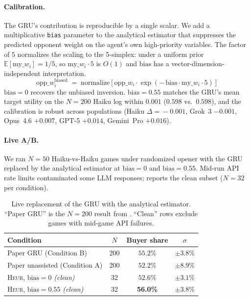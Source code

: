 \documentclass[11pt,a4paper]{article}
\begin{document}
\paragraph{Calibration.} The GRU's contribution is reproducible by a single scalar. We add a multiplicative \texttt{bias} parameter to the analytical estimator that suppresses the predicted opponent weight on the agent's own high-priority variables. The factor of $5$ normalizes the scaling to the 5-simplex: under a uniform prior $\mathbb{E}[\text{my\_}w_i] = 1/5$, so $\text{my\_}w_i \cdot 5$ is $O(1)$ and $\text{bias}$ has a vector-dimension-independent interpretation.
\begin{equation}
\text{opp\_}w_i^{\text{biased}} \;=\; \mathrm{normalize}\!\left[\text{opp\_}w_i \cdot \exp(-\,\text{bias} \cdot \text{my\_}w_i \cdot 5)\right]
\label{eq:bias_scalar}
\end{equation}
$\text{bias} = 0$ recovers the unbiased inversion. $\text{bias} = 0.55$ matches the GRU's mean target utility on the $N\!=\!200$ Haiku log within $0.001$ ($0.598$ vs.\ $0.598$), and the calibration is robust across populations (Haiku $\Delta\!=\!-0.001$, Grok~3 $-0.001$, Opus~4.6 $+0.007$, GPT-5 $+0.014$, Gemini~Pro $+0.016$).

\paragraph{Live A/B.} We ran $N\!=\!50$ Haiku-vs-Haiku games under randomized opener with the GRU replaced by the analytical estimator at $\text{bias} = 0$ and $\text{bias} = 0.55$. Mid-run API rate limits contaminated some LLM responses;  reports the clean subset ($N\!=\!32$ per condition).

\begin{table}[h]
\centering
\caption{Live replacement of the GRU with the analytical estimator. ``Paper GRU'' is the $N = 200$ result from . ``Clean'' rows exclude games with mid-game API failures.}
\label{tab:bias_scalar_live}
\small
\begin{tabular}{lccc}
\toprule
Condition & $N$ & Buyer share & $\sigma$ \\
\midrule
Paper GRU (Condition B) & 200 & $55.2\%$ & $\pm 3.8\%$ \\
Paper unassisted (Condition A) & 200 & $52.2\%$ & $\pm 8.9\%$ \\
\midrule
\textsc{Heur}, $\text{bias} = 0$ \emph{(clean)} & 32 & $52.6\%$ & $\pm 3.1\%$ \\
\textsc{Heur}, $\text{bias} = 0.55$ \emph{(clean)} & 32 & \textbf{56.0\%} & $\pm 3.8\%$ \\
\bottomrule
\end{tabular}
\end{table}
\end{document}
